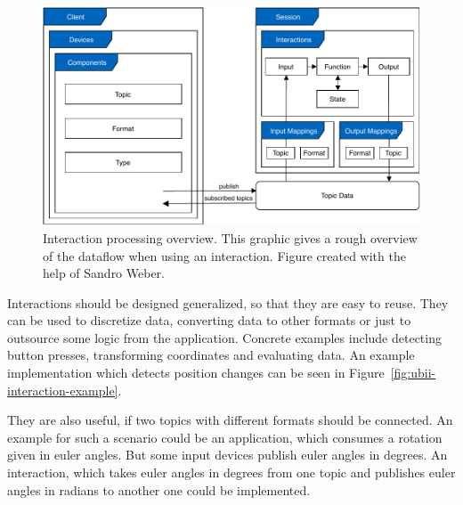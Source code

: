 \begin{figure}[htpb]
  \centering
  \includegraphics[width=12cm]{figures/ubii_cd.pdf}
  \caption[UBII communication diagram]{Interaction processing overview. This graphic gives a rough overview of the dataflow when using an interaction. Figure created with the help of Sandro Weber.}\label{fig:ubii-cd}
\end{figure}

Interactions should be designed generalized, so that they are easy to reuse. They can be used to discretize data, converting data to other formats or just to outsource some logic from the application. Concrete examples include detecting button presses, transforming coordinates and evaluating data. An example implementation which detects position changes can be seen in Figure~\ref{fig:ubii-interaction-example}.

They are also useful, if two topics with different formats should be connected. An example for such a scenario could be an application, which consumes a rotation given in euler angles. But some input devices publish euler angles in degrees. An interaction, which takes euler angles in degrees from one topic and publishes euler angles in radians to another one could be implemented.

